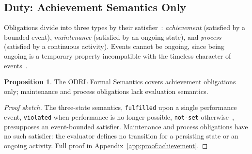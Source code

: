 \documentclass{IOS-Book-Article}
\theoremstyle{definition}
\newtheorem{proposition}{Proposition}[section]
\begin{document}
\subsection{Duty: Achievement Semantics Only}
\label{sec:classification:duty}
Obligations divide into three types by their
satisfier~\cite{wright1963norm,guarino2024processes}:
\emph{achievement} (satisfied by a bounded event),
\emph{maintenance} (satisfied by an ongoing state), and
\emph{process} (satisfied by a continuous activity). Events cannot
be ongoing, since being ongoing is a temporary property incompatible
with the timeless character of events~\cite{guarino2024processes}.
\begin{proposition}
\label{prop:achievement}
The ODRL Formal Semantics covers achievement obligations only;
maintenance and process obligations lack evaluation semantics.
\end{proposition}
\begin{proof}[Proof sketch]
The three-state semantics, \texttt{fulfilled} upon a single
performance event, \texttt{violated} when performance is no longer
possible, \texttt{not-set} otherwise~\cite{odrl-formal-semantics}, presupposes
an event-bounded satisfier. Maintenance and process obligations have
no such satisfier: the evaluator defines no transition for a
persisting state or an ongoing activity. Full proof in
Appendix~\ref{app:proof:achievement}.
\end{proof}
\end{document}
